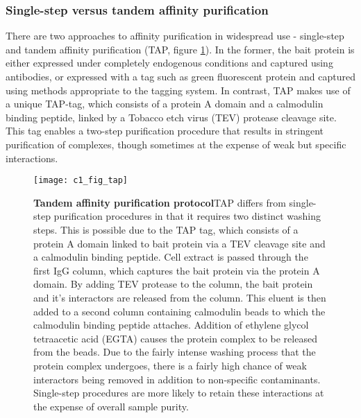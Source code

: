 \documentclass[a4paper,11pt,twoside,openright]{scrbook}
\begin{document}
\subsubsection{Single-step versus tandem affinity purification}
There are two approaches to affinity purification in widespread use -
single-step and tandem affinity purification \cite{Rigaut1999} (TAP, figure
\ref{figure:tap}). In the former, the bait protein is either expressed under
completely endogenous conditions and captured using antibodies, or expressed
with a tag such as green fluorescent protein \cite{Hubner2010} and captured
using methods appropriate to the tagging system. In contrast, TAP makes use of a
unique TAP-tag, which consists of a protein A domain and a calmodulin binding
peptide, linked by a Tobacco etch virus (TEV) protease cleavage site. This tag
enables a two-step purification procedure that results in stringent purification
of complexes, though sometimes at the expense of weak but specific interactions.

\begin{figure}[h]
\fcapsideright
    {\caption[Tandem affinity purification protocol]{\sffamily\textbf{Tandem
    affinity \newline purification protocol}\newline \small TAP differs from
    single-step purification procedures in that it requires two distinct washing
    steps. This is possible due to the TAP tag, which consists of a protein A
    domain linked to bait protein via a TEV cleavage site and a calmodulin
    binding peptide. Cell extract is passed through the first IgG column, which
    captures the bait protein via the protein A domain. By adding TEV protease
    to the column, the bait protein and it's interactors are released from the
    column. This eluent is then added to a second column containing calmodulin
    beads to which the calmodulin  binding peptide attaches. Addition of
    ethylene glycol tetraacetic acid (EGTA) causes the protein complex to be
    released from the beads. Due to the fairly intense washing process that the
    protein complex undergoes, there is a fairly high chance of weak interactors
    being removed in addition to non-specific contaminants. Single-step
    procedures are more likely to retain these interactions at the expense of
    overall sample purity.}\label{figure:tap}} {\texttt{[image: c1\_fig\_tap]}}
\end{figure}
\end{document}
